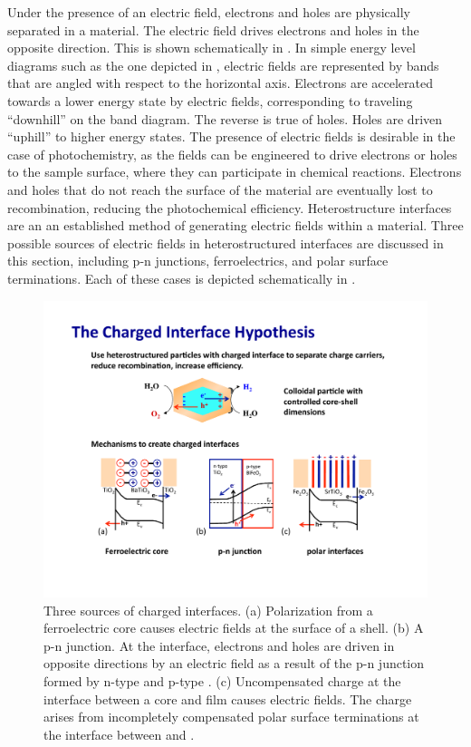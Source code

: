 Under the presence of an electric field, electrons and holes are physically separated in a
material. The electric field drives electrons and holes in the opposite direction. This is
shown schematically in . In simple energy level diagrams
such as the one depicted in , electric fields are
represented by bands that are angled with respect to the horizontal axis. Electrons are
accelerated towards a lower energy state by electric fields, corresponding to traveling
``downhill'' on the band diagram. The reverse is true of holes. Holes are driven
``uphill'' to higher energy states. The presence of electric fields is desirable in the
case of photochemistry, as the fields can be engineered to drive electrons or holes to the
sample surface, where they can participate in chemical reactions. Electrons and holes that
do not reach the surface of the material are eventually lost to recombination, reducing
the photochemical efficiency. Heterostructure interfaces are an an established method of
generating electric fields within a material. Three possible sources of electric fields in
heterostructured interfaces are discussed in this section, including p-n junctions,
ferroelectrics, and polar surface terminations. Each of these cases is depicted
schematically in . 

\begin{figure}

	\includegraphics[width=\textwidth]{chargedinterfaces.pdf}
		\caption[Three sources of charged interfaces]{%
			Three sources of charged interfaces. (a) Polarization from a 
			ferroelectric  core causes electric fields at the 
			surface of a  shell. (b) A p-n junction. At the 
			interface, electrons and holes are driven in opposite directions 
			by an electric field as a result of the p-n junction formed by 
			n-type  and p-type . (c) Uncompensated 
			charge at the interface between a core and film causes electric 
			fields. The charge arises from incompletely compensated polar 
			surface terminations at the interface between  and 
			.}
	\label{fig:chargedinterfaces}

\end{figure}


